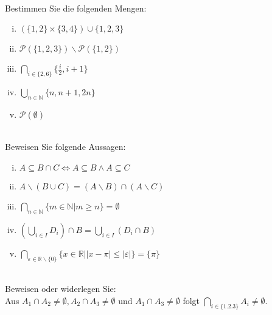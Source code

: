 \newcommand{\printpraesenzlsg}{false}
\newcommand{\printloesungen}{false}
\newcommand{\printbewertungen}{false}
\newcommand{\blattnummer}{2}



\iforiginal{}

	

 \\
Bestimmen Sie die folgenden Mengen:
\begin{enumerate}[(i)]
  \item $(\{1,2\}\times\{3,4\})\cup\{1,2,3\}$
  \item $\mathscr{P}(\{1,2,3\})\backslash\mathscr{P}(\{1,2\})$
  \item $\bigcap_{i\in\{2,6\}}\{\frac{i}{2},i+1\}$ 
  \item $\bigcup_{n\in\mathbb{N}}\{n,n+1,2n\}$
  \item $\mathscr{P}(\emptyset)$
\end{enumerate}


 \\
Beweisen Sie folgende Aussagen:
\begin{enumerate}[(i)]
  \item $A\subseteq B\cap C\Leftrightarrow A\subseteq B\wedge A\subseteq C$
  \item $A\backslash(B\cup C)=(A\backslash B)\cap (A\backslash C)$
  \item $\bigcap_{n\in\mathbb{N}}\{m\in\mathbb{N}|m\geq n\}=\emptyset$
  \item $\left(\bigcup_{i\in I}D_i\right)\cap B=\bigcup_{i\in I}(D_i\cap B)$
  \item $\bigcap_{\varepsilon\in\mathbb{R}\backslash\{0\}}\{x\in\mathbb{R}||x-\pi|\leq |\varepsilon|\}=\{\pi\}$
\end{enumerate}


 \\
Beweisen oder widerlegen Sie:\\
Aus $A_1\cap A_2\neq\emptyset, A_2\cap A_3\neq\emptyset$ und $A_1\cap A_3\neq\emptyset$ folgt $\bigcap_{i\in\{1.2.3\}}A_i\neq\emptyset$.


